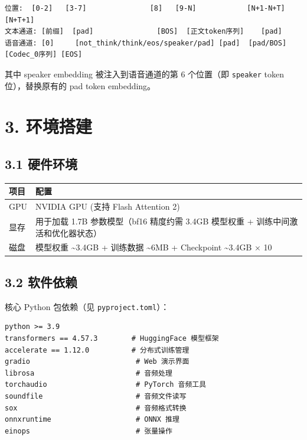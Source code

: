 \documentclass[
  english,
  letterpaper,
  DIV=11,
  numbers=noendperiod]{scrartcl}
\newcounter{none} %
\begin{document}
\begin{verbatim}
位置:  [0-2]   [3-7]               [8]   [9-N]            [N+1-N+T]      [N+T+1]
文本通道: [前缀]  [pad]               [BOS]  [正文token序列]    [pad]
语音通道: [0]     [not_think/think/eos/speaker/pad] [pad]  [pad/BOS]      [Codec_0序列] [EOS]
\end{verbatim}

其中 speaker embedding 被注入到语音通道的第 6 个位置（即
\texttt{speaker} token 位），替换原有的 pad token embedding。

\section{3. 环境搭建}\label{sec-env}

\subsection{3.1 硬件环境}\label{ux786cux4ef6ux73afux5883}

{\def\LTcaptype{none} %
\begin{longtable}[]{@{}
  >{\raggedright\arraybackslash}p{}
  >{\raggedright\arraybackslash}p{}@{}}
\toprule\noalign{}
\begin{minipage}[b]{\linewidth}\raggedright
项目
\end{minipage} & \begin{minipage}[b]{\linewidth}\raggedright
配置
\end{minipage} \\
\midrule\noalign{}
\endhead
\bottomrule\noalign{}
\endlastfoot
GPU & NVIDIA GPU (支持 Flash Attention 2) \\
显存 & 用于加载 1.7B 参数模型（bf16 精度约需 3.4GB 模型权重 +
训练中间激活和优化器状态） \\
磁盘 & 模型权重 \textasciitilde3.4GB + 训练数据 \textasciitilde6MB +
Checkpoint \textasciitilde3.4GB × 10 \\
\end{longtable}
}

\subsection{3.2 软件依赖}\label{ux8f6fux4ef6ux4f9dux8d56}

核心 Python 包依赖（见 \texttt{pyproject.toml}）：

\begin{verbatim}
python >= 3.9
transformers == 4.57.3        # HuggingFace 模型框架
accelerate == 1.12.0          # 分布式训练管理
gradio                         # Web 演示界面
librosa                        # 音频处理
torchaudio                     # PyTorch 音频工具
soundfile                      # 音频文件读写
sox                            # 音频格式转换
onnxruntime                    # ONNX 推理
einops                         # 张量操作
\end{verbatim}
\end{document}
